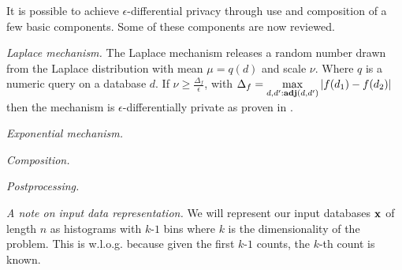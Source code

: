 \documentclass{article}
\begin{document}
It is possible to achieve $\epsilon$-differential privacy through use and composition of
a few basic components. Some of these components are now reviewed.

\noindent \emph{Laplace mechanism.}
The Laplace mechanism releases a random number drawn from the Laplace distribution with
mean $\mu=q(d)$ and scale $\nu$. Where $q$ is a numeric query on a database $d$.
If $\nu\geq \frac{\Delta_f}{\epsilon}$, with $\Delta_f=\displaystyle\max_{d,d':\textbf{adj}(d,d')}{\lvert f(d_1)-f(d_2)\lvert}$
then the mechanism is $\epsilon$-differentially private as proven in \cite{???}.

\noindent \emph{Exponential mechanism.}
 
\noindent \emph{Composition.}

\noindent \emph{Postprocessing.}

\noindent \emph{A note on input data representation.}
We will represent our input databases $\textbf{x}$ of length $n$ as histograms 
with $k$-$1$ bins where $k$ is the dimensionality of the problem.
This is w.l.o.g. because given the first $k$-$1$ counts, the $k$-th count
is known.
\end{document}
